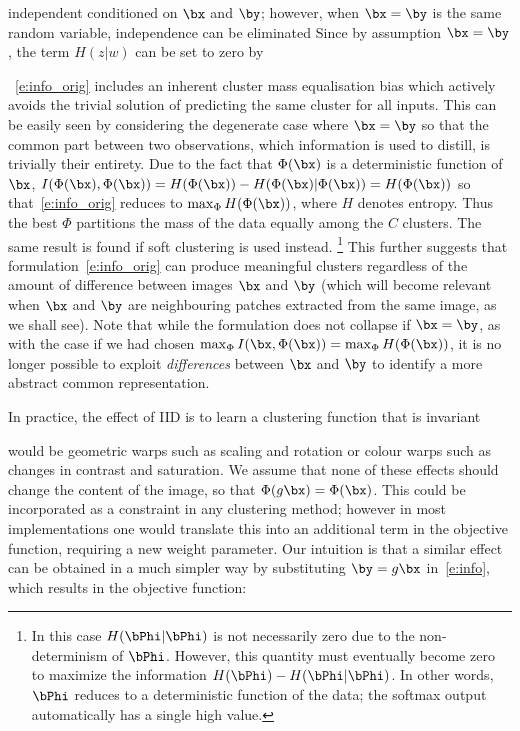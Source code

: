 independent conditioned on $\bx$ and $\by$; however, when $\bx=\by$ is the same random variable, independence can be eliminated 
Since by assumption $\bx=\by$,
the term $H(z|w)$ can be set to zero by 

~\cref{e:info_orig} includes an inherent cluster mass equalisation bias which actively avoids the trivial solution of predicting the same cluster for all inputs. This can be easily seen by considering the degenerate case where $\bx = \by$ so that the common part between two observations, which information is used to distill, is trivially their entirety. Due to the fact that $\Phi(\bx)$ is a deterministic function of $\bx$, $I(\Phi(\bx),\Phi(\bx)) = H(\Phi(\bx)) - H(\Phi(\bx)|\Phi(\bx))= H(\Phi(\bx))$ so that~\cref{e:info_orig} reduces to $\max_{\Phi} H(\Phi(\bx))$, where $H$ denotes entropy. Thus the best $\Phi$ partitions the mass of the data equally among the $C$ clusters. The same result is found if soft clustering is used instead.%
%
\footnote{In this case $H(\bPhi|\bPhi)$ is not necessarily zero due to the non-determinism of $\bPhi$. However, this quantity must eventually become zero to maximize the information $H(\bPhi) - H(\bPhi|\bPhi)$. In other words, $\bPhi$ reduces to a deterministic function of the data; the softmax output automatically has a single high value.
}
%
This further suggests that formulation~\eqref{e:info_orig} can produce meaningful clusters regardless of the amount of difference between images $\bx$ and $\by$ (which will become relevant when $\bx$ and $\by$ are neighbouring patches extracted from the same image, as we shall see). Note that while the formulation does not collapse if $\bx=\by$, as with the case if we had chosen $\max_{\Phi} I(\bx, \Phi(\bx)) = \max_{\Phi} H(\Phi(\bx))$, it is no longer possible to exploit \textit{differences} between  $\bx$ and $\by$ to identify a more abstract common representation.

In practice, the effect of IID is to learn a clustering function that is invariant 

would be geometric warps such as scaling and rotation or colour warps such as changes in contrast and saturation. We assume that none of these effects should change the content of the image, so that $\Phi(g\bx)=\Phi(\bx)$. This could be incorporated as a constraint in any clustering method; however in most implementations one would translate this into an additional term in the objective function, requiring a new weight parameter. Our intuition is that a similar effect can be obtained in a much simpler way by substituting $\by = g\bx$ in~\cref{e:info}, which results in the objective function:

